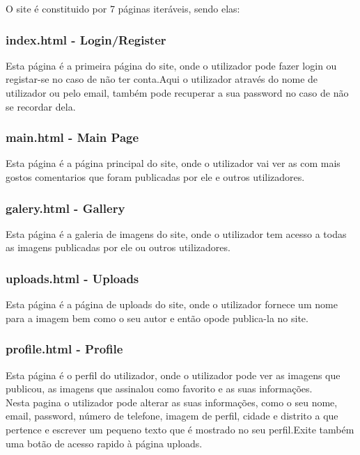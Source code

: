 \documentclass{report}
\begin{document}
\indent O site é constituido por 7 páginas iteráveis, sendo elas:

\subsubsection{index.html - Login/Register}

\indent Esta página é a primeira página do site, onde o utilizador pode fazer login ou registar-se no caso de não ter conta.Aqui o utilizador através do nome de utilizador ou pelo email, também pode recuperar a sua password no caso de não se recordar dela.\\


\subsubsection{main.html - Main Page}

\indent Esta página é a página principal do site, onde o utilizador vai ver as com mais gostos comentarios que foram publicadas por ele e outros utilizadores.\\


\subsubsection{galery.html - Gallery}

\indent Esta página é a galeria de imagens do site, onde o utilizador tem acesso a todas as imagens publicadas por ele ou outros utilizadores.\\

\subsubsection{uploads.html - Uploads}

\indent Esta página é a página de uploads do site, onde o utilizador fornece um nome para a imagem bem como o seu autor e então opode publica-la no site.\\

\subsubsection{profile.html - Profile}

\indent Esta página é o perfil do utilizador, onde o utilizador pode ver as imagens que publicou, as imagens que assinalou como favorito e as suas informações.\\
\indent Nesta pagina o utilizador pode alterar as suas informações, como o seu nome, email, password, número de telefone, imagem de perfil, cidade e distrito a que pertence e escrever um pequeno texto que é mostrado no seu perfil.Exite  também uma botão de acesso rapido à página uploads.\\
\end{document}
